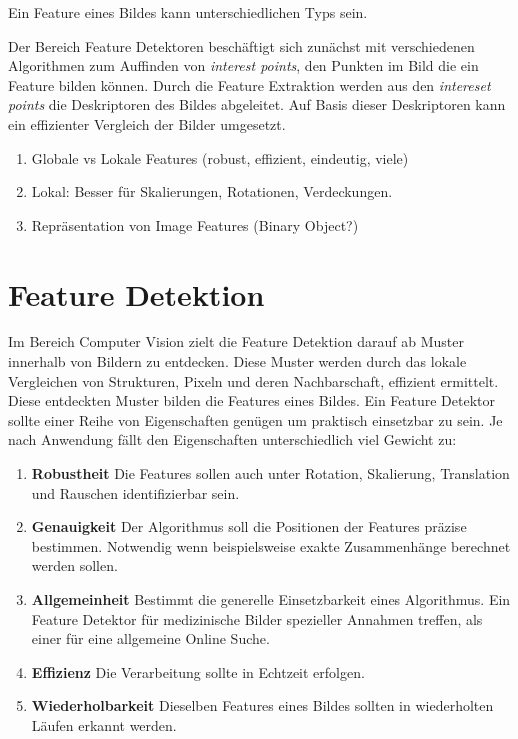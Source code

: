 Ein Feature eines Bildes kann unterschiedlichen Typs sein.

Der Bereich Feature Detektoren beschäftigt sich zunächst mit verschiedenen Algorithmen zum Auffinden von \textit{interest points}, den Punkten im Bild die ein Feature bilden können. 
Durch die Feature Extraktion werden aus den \textit{intereset points} die Deskriptoren des Bildes abgeleitet. Auf Basis dieser Deskriptoren kann ein effizienter Vergleich der Bilder umgesetzt.

\begin{enumerate}	
	\item Globale vs Lokale Features (robust, effizient, eindeutig, viele)
	\item Lokal: Besser für Skalierungen, Rotationen, Verdeckungen.
	\item Repräsentation von Image Features (Binary Object?)	
\end{enumerate}

\section{Feature Detektion}

Im Bereich Computer Vision zielt die Feature Detektion darauf ab Muster innerhalb von Bildern zu entdecken. Diese Muster werden durch das lokale Vergleichen von Strukturen, Pixeln und deren Nachbarschaft, effizient ermittelt. Diese entdeckten Muster bilden die Features eines Bildes. Ein Feature Detektor sollte einer Reihe von Eigenschaften genügen um praktisch einsetzbar zu sein. Je nach Anwendung fällt den Eigenschaften unterschiedlich viel Gewicht zu:

\begin{enumerate}
	\item \textbf{Robustheit} Die Features sollen auch unter Rotation, Skalierung, Translation und Rauschen identifizierbar sein.
	\item \textbf{Genauigkeit} Der Algorithmus soll die Positionen der Features präzise bestimmen. Notwendig wenn beispielsweise exakte Zusammenhänge berechnet werden sollen.
	\item \textbf{Allgemeinheit} Bestimmt die generelle Einsetzbarkeit eines Algorithmus. Ein Feature Detektor für medizinische Bilder spezieller Annahmen treffen, als einer für eine allgemeine Online Suche.
	\item \textbf{Effizienz} Die Verarbeitung sollte in Echtzeit erfolgen.
	\item \textbf{Wiederholbarkeit} Dieselben Features eines Bildes sollten in wiederholten Läufen erkannt werden.
\end{enumerate}

